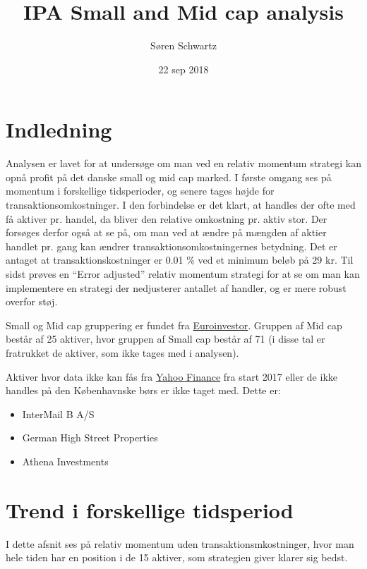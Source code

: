 \documentclass[]{article}
\title{IPA Small and Mid cap analysis}
\author{Søren Schwartz}
\date{22 sep 2018}
\providecommand{\tightlist}{%
  \setlength{\itemsep}{0pt}\setlength{\parskip}{0pt}}
\begin{document}
\maketitle

\hypertarget{indledning}{%
\section{Indledning}\label{indledning}}

Analysen er lavet for at undersøge om man ved en relativ momentum
strategi kan opnå profit på det danske small og mid cap marked. I første
omgang ses på momentum i forskellige tidsperioder, og senere tages højde
for transaktionsomkostninger. I den forbindelse er det klart, at handles
der ofte med få aktiver pr. handel, da bliver den relative omkostning
pr. aktiv stor. Der forsøges derfor også at se på, om man ved at ændre
på mængden af aktier handlet pr. gang kan ændrer
transaktionsomkostningernes betydning. Det er antaget at
transaktionskostninger er 0.01 \% ved et minimum beløb på 29 kr. Til
sidst prøves en ``Error adjusted'' relativ momentum strategi for at se
om man kan implementere en strategi der nedjusterer antallet af handler,
og er mere robust overfor støj.

Small og Mid cap gruppering er fundet fra
\href{https://www.euroinvestor.dk/markeder/aktier/europa/danmark}{Euroinvestor}.
Gruppen af Mid cap består af 25 aktiver, hvor gruppen af Small cap
består af 71 (i disse tal er fratrukket de aktiver, som ikke tages med i
analysen).

Aktiver hvor data ikke kan fås fra
\href{https://finance.yahoo.com/}{Yahoo Finance} fra start 2017 eller de
ikke handles på den Københavnske børs er ikke taget med. Dette er:

\begin{itemize}
\tightlist
\item
  InterMail B A/S
\item
  German High Street Properties
\item
  Athena Investments
\end{itemize}

\hypertarget{trend-i-forskellige-tidsperiod}{%
\section{Trend i forskellige
tidsperiod}\label{trend-i-forskellige-tidsperiod}}

I dette afsnit ses på relativ momentum uden transaktionsmkostninger,
hvor man hele tiden har en position i de 15 aktiver, som strategien
giver klarer sig bedst.
\end{document}
